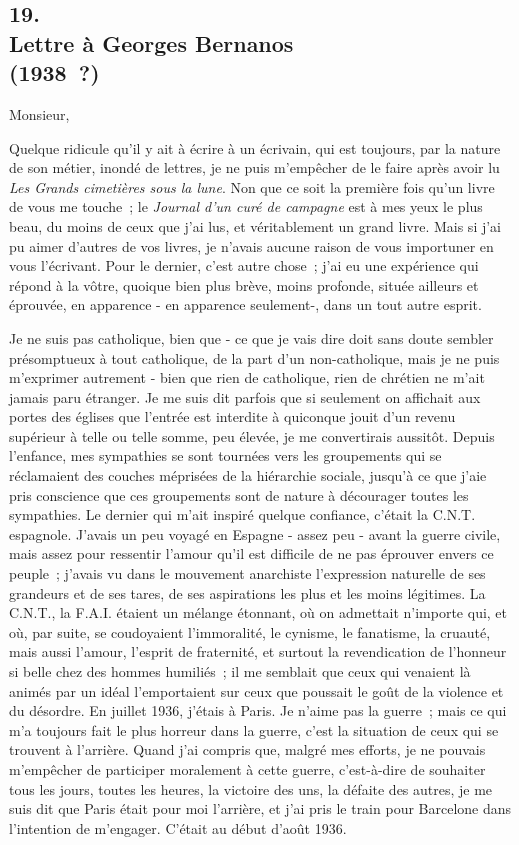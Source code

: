 \documentclass[french,twoside]{book} %
\begin{document}
\subsection[19. Lettre à Georges Bernanos, (1938 ?)]{19. \\
Lettre à Georges Bernanos \\
(1938 ?)}
\noindent \par
Monsieur,\par
Quelque ridicule qu'il y ait à écrire à un écrivain, qui est toujours, par la nature de son métier, inondé de lettres, je ne puis m'empêcher de le faire après avoir lu {\itshape Les Grands cimetières sous la lune}. Non que ce soit la première fois qu'un livre de vous me touche ; le {\itshape Journal d'un curé de campagne} est à mes yeux le plus beau, du moins de ceux que j'ai lus, et véritablement un grand livre. Mais si j'ai pu aimer d'autres de vos livres, je n'avais aucune raison de vous importuner en vous l'écrivant. Pour le dernier, c'est autre chose ; j'ai eu une expérience qui répond à la vôtre, quoique bien plus brève, moins pro­fonde, située ailleurs et éprouvée, en apparence - en apparence seulement-, dans un tout autre esprit.\par
Je ne suis pas catholique, bien que - ce que je vais dire doit sans doute sembler présomptueux à tout catholique, de la part d'un non-catholique, mais je ne puis m'exprimer autrement - bien que rien de catholique, rien de chrétien ne m'ait jamais paru étranger. Je me suis dit parfois que si seulement on affichait aux portes des églises que l'entrée est interdite à quiconque jouit d'un revenu supérieur à telle ou telle somme, peu élevée, je me convertirais aussi­tôt. Depuis l'enfance, mes sympathies se sont tournées vers les groupements qui se réclamaient des couches méprisées de la hiérarchie sociale, jusqu'à ce que j'aie pris conscience que ces groupements sont de nature à décourager toutes les sympathies. Le dernier qui m'ait inspiré quelque confiance, c'était la C.N.T. espagnole. J'avais un peu voyagé en Espagne - assez peu - avant la guerre civile, mais assez pour ressentir l'amour qu'il est difficile de ne pas éprouver envers ce peuple ; j'avais vu dans le mouvement anarchiste l'expres­sion naturelle de ses grandeurs et de ses tares, de ses aspirations les plus et les moins légitimes. La C.N.T., la F.A.I. étaient un mélange étonnant, où on admettait n'importe qui, et où, par suite, se coudoyaient l'immoralité, le cynisme, le fanatisme, la cruauté, mais aussi l'amour, l'esprit de fraternité, et surtout la revendication de l'honneur si belle chez des hommes humiliés ; il me semblait que ceux qui venaient là animés par un idéal l'emportaient sur ceux que poussait le goût de la violence et du désordre. En juillet 1936, j'étais à Paris. Je n'aime pas la guerre ; mais ce qui m'a toujours fait le plus horreur dans la guerre, c'est la situation de ceux qui se trouvent à l'arrière. Quand j'ai compris que, malgré mes efforts, je ne pouvais m'empêcher de participer moralement à cette guerre, c'est-à-dire de souhaiter tous les jours, toutes les heures, la victoire des uns, la défaite des autres, je me suis dit que Paris était pour moi l'arrière, et j'ai pris le train pour Barcelone dans l'intention de m'engager. C'était au début d'août 1936.\par
\end{document}
